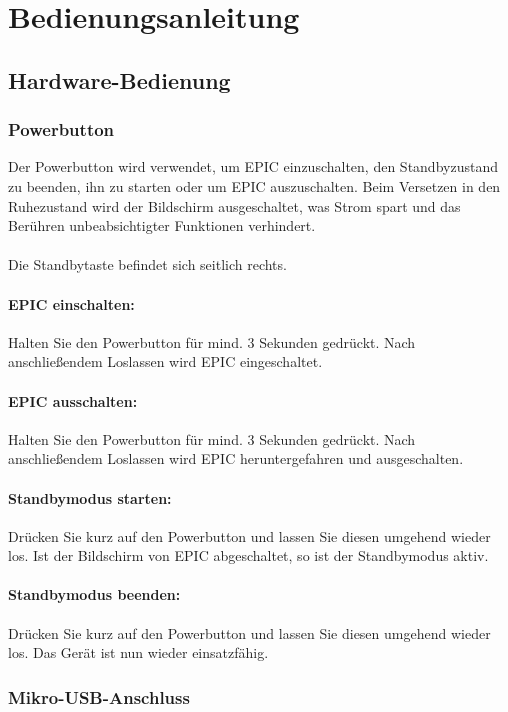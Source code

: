 \section{Bedienungsanleitung}

\subsection{Hardware-Bedienung}

\subsubsection{Powerbutton}

Der Powerbutton wird verwendet, um EPIC einzuschalten, den Standbyzustand zu beenden, ihn zu starten oder um EPIC auszuschalten. Beim Versetzen in den Ruhezustand wird der Bildschirm ausgeschaltet, was Strom spart und das Berühren unbeabsichtigter Funktionen verhindert.\\
\\
Die Standbytaste befindet sich seitlich rechts.


\paragraph{EPIC einschalten:}
Halten Sie den Powerbutton für mind. 3 Sekunden gedrückt. Nach anschließendem Loslassen wird EPIC eingeschaltet.

\paragraph{EPIC ausschalten:}
Halten Sie den Powerbutton für mind. 3 Sekunden gedrückt. Nach anschließendem Loslassen wird EPIC heruntergefahren und ausgeschalten.

\paragraph{Standbymodus starten:}
Drücken Sie kurz auf den Powerbutton und lassen Sie diesen umgehend wieder los. Ist der Bildschirm von EPIC abgeschaltet, so ist der Standbymodus aktiv.

\paragraph{Standbymodus beenden:}
Drücken Sie kurz auf den Powerbutton und lassen Sie diesen umgehend wieder los. Das Gerät ist nun wieder einsatzfähig.

\subsubsection{Mikro-USB-Anschluss}

